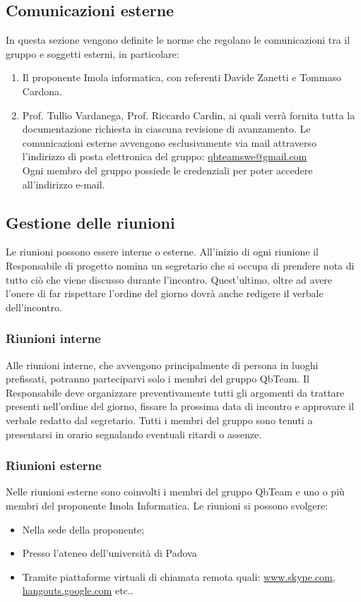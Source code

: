 \subsection{Comunicazioni esterne}

In questa sezione vengono definite le norme che regolano le comunicazioni tra il gruppo e soggetti esterni, in particolare:
\begin{enumerate}
	\item Il proponente Imola informatica, con referenti Davide Zanetti e Tommaso Cardona.
	\item Prof. Tullio Vardanega, Prof. Riccardo Cardin, ai quali verrà fornita tutta la documentazione richiesta in ciascuna revisione di avanzamento.
	Le comunicazioni esterne avvengono esclusivamente via mail attraverso l’indirizzo di posta elettronica del gruppo:
	\url{qbteamswe@gmail.com} \\
	Ogni membro del gruppo possiede le credenziali per poter accedere all’indirizzo e-mail.

	\end{enumerate}
	
\subsection{Gestione delle riunioni}
Le riunioni possono essere interne o esterne. All’inizio di ogni riunione il Responsabile di progetto nomina un segretario che si occupa di prendere nota di tutto ciò che viene discusso durante l’incontro. Quest’ultimo, oltre ad avere l’onere di far rispettare l’ordine del giorno dovrà anche redigere il verbale dell’incontro.

\subsubsection{Riunioni interne}
Alle riunioni interne, che avvengono principalmente di persona in luoghi prefissati, potranno parteciparvi solo i membri del gruppo QbTeam.
Il Responsabile deve organizzare preventivamente tutti gli argomenti da trattare presenti nell’ordine del giorno, fissare la prossima data di incontro e approvare il verbale redatto dal segretario.
Tutti i membri del gruppo sono tenuti a presentarsi in orario segnalando eventuali ritardi o assenze.
\subsubsection{Riunioni esterne}
Nelle riunioni esterne sono coinvolti i membri del gruppo QbTeam e uno o più membri del proponente Imola Informatica.
Le riunioni si possono svolgere:
\begin{itemize}
	\item Nella sede della proponente;
	\item Presso l’ateneo dell’università di Padova
	\item Tramite piattaforme virtuali di chiamata remota quali: \url{www.skype.com}, \url{hangouts.google.com} etc..

	\end{itemize}
	
